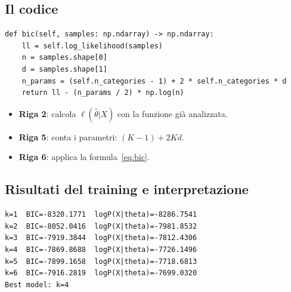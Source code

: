 \documentclass[11pt,a4paper]{article}
\begin{document}
\subsection{Il codice}

\begin{lstlisting}[caption={Calcolo del BIC}]
def bic(self, samples: np.ndarray) -> np.ndarray:
    ll = self.log_likelihood(samples)
    n = samples.shape[0]
    d = samples.shape[1]
    n_params = (self.n_categories - 1) + 2 * self.n_categories * d
    return ll - (n_params / 2) * np.log(n)
\end{lstlisting}

\begin{itemize}[nosep]
  \item \textbf{Riga 2}: calcola $\ell(\hat\theta|X)$ con la funzione
        già analizzata.
  \item \textbf{Riga 5}: conta i parametri: $(K-1) + 2Kd$.
  \item \textbf{Riga 6}: applica la formula~\eqref{eq:bic}.
\end{itemize}

\subsection{Risultati del training e interpretazione}

\begin{lstlisting}[language={},caption={Output del training}]
k=1  BIC=-8320.1771  logP(X|theta)=-8286.7541
k=2  BIC=-8052.0416  logP(X|theta)=-7981.8532
k=3  BIC=-7919.3844  logP(X|theta)=-7812.4306
k=4  BIC=-7869.8688  logP(X|theta)=-7726.1496
k=5  BIC=-7899.1658  logP(X|theta)=-7718.6813
k=6  BIC=-7916.2819  logP(X|theta)=-7699.0320
Best model: k=4
\end{lstlisting}
\end{document}
